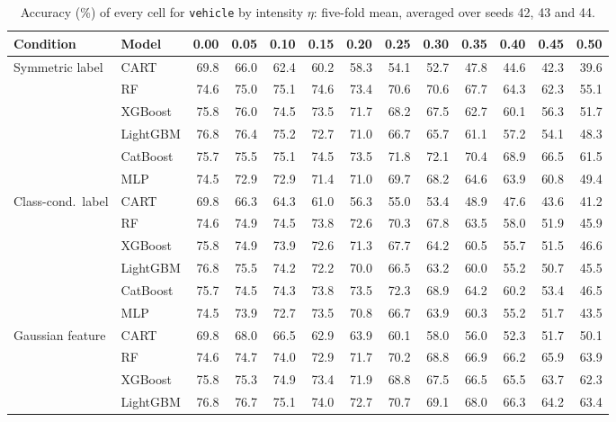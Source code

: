 \begin{table}[p]
\centering
\tiny
\setlength{\tabcolsep}{2.6pt}
\caption{Accuracy (\%) of every cell for \texttt{vehicle} by intensity $\eta$: five-fold mean, averaged over seeds 42, 43 and 44.}
\label{tab:grid_vehicle}
\begin{tabular}{@{}llrrrrrrrrrrr@{}}
\toprule
Condition & Model & 0.00 & 0.05 & 0.10 & 0.15 & 0.20 & 0.25 & 0.30 & 0.35 & 0.40 & 0.45 & 0.50 \\
\midrule
Symmetric label & CART & 69.8 & 66.0 & 62.4 & 60.2 & 58.3 & 54.1 & 52.7 & 47.8 & 44.6 & 42.3 & 39.6 \\
 & RF & 74.6 & 75.0 & 75.1 & 74.6 & 73.4 & 70.6 & 70.6 & 67.7 & 64.3 & 62.3 & 55.1 \\
 & XGBoost & 75.8 & 76.0 & 74.5 & 73.5 & 71.7 & 68.2 & 67.5 & 62.7 & 60.1 & 56.3 & 51.7 \\
 & LightGBM & 76.8 & 76.4 & 75.2 & 72.7 & 71.0 & 66.7 & 65.7 & 61.1 & 57.2 & 54.1 & 48.3 \\
 & CatBoost & 75.7 & 75.5 & 75.1 & 74.5 & 73.5 & 71.8 & 72.1 & 70.4 & 68.9 & 66.5 & 61.5 \\
 & MLP & 74.5 & 72.9 & 72.9 & 71.4 & 71.0 & 69.7 & 68.2 & 64.6 & 63.9 & 60.8 & 49.4 \\
\midrule
Class-cond.\ label & CART & 69.8 & 66.3 & 64.3 & 61.0 & 56.3 & 55.0 & 53.4 & 48.9 & 47.6 & 43.6 & 41.2 \\
 & RF & 74.6 & 74.9 & 74.5 & 73.8 & 72.6 & 70.3 & 67.8 & 63.5 & 58.0 & 51.9 & 45.9 \\
 & XGBoost & 75.8 & 74.9 & 73.9 & 72.6 & 71.3 & 67.7 & 64.2 & 60.5 & 55.7 & 51.5 & 46.6 \\
 & LightGBM & 76.8 & 75.5 & 74.2 & 72.2 & 70.0 & 66.5 & 63.2 & 60.0 & 55.2 & 50.7 & 45.5 \\
 & CatBoost & 75.7 & 74.5 & 74.3 & 73.8 & 73.5 & 72.3 & 68.9 & 64.2 & 60.2 & 53.4 & 46.5 \\
 & MLP & 74.5 & 73.9 & 72.7 & 73.5 & 70.8 & 66.7 & 63.9 & 60.3 & 55.2 & 51.7 & 43.5 \\
\midrule
Gaussian feature & CART & 69.8 & 68.0 & 66.5 & 62.9 & 63.9 & 60.1 & 58.0 & 56.0 & 52.3 & 51.7 & 50.1 \\
 & RF & 74.6 & 74.7 & 74.0 & 72.9 & 71.7 & 70.2 & 68.8 & 66.9 & 66.2 & 65.9 & 63.9 \\
 & XGBoost & 75.8 & 75.3 & 74.9 & 73.4 & 71.9 & 68.8 & 67.5 & 66.5 & 65.5 & 63.7 & 62.3 \\
 & LightGBM & 76.8 & 76.7 & 75.1 & 74.0 & 72.7 & 70.7 & 69.1 & 68.0 & 66.3 & 64.2 & 63.4 \\

\end{tabular}
\end{table}
